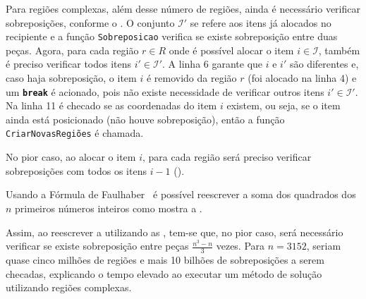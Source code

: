 

Para regiões complexas, além desse número de regiões, ainda é necessário verificar sobreposições,
conforme o .
O conjunto $\mathcal{I'}$ se refere aos itens já alocados no recipiente e a função
\texttt{Sobreposicao} verifica se existe sobreposição entre duas peças.
Agora, para cada região $r \in R$ onde é possível alocar o item $i \in \mathcal{I}$, também é
preciso verificar todos itens $i' \in \mathcal{I'}$.
A linha 6 garante que $i$ e $i'$ são diferentes e, caso haja sobreposição, o item $i$ é removido
da região $r$ (foi alocado na linha 4) e um \texttt{\textbf{break}} é acionado, pois não existe
necessidade de verificar outros itens $i' \in \mathcal{I'}$.
Na linha 11 é checado se as coordenadas do item $i$ existem, ou seja, se o item ainda está
posicionado (não houve sobreposição), então a função \texttt{CriarNovasRegiões} é chamada.



No pior caso, ao alocar o item $i$, para cada região será preciso verificar sobreposições com
todos os itens $i - 1$ ().



Usando a Fórmula de Faulhaber~\cite{merca2015alternative} é possível reescrever a soma dos quadrados
dos $n$ primeiros números inteiros como mostra a .



Assim, ao reescrever a  utilizando as ,
tem-se que, no pior caso, será necessário verificar se existe sobreposição entre peças
$\frac{n^3-n}{3}$ vezes.
Para $n = 3152$, seriam quase cinco milhões de regiões e mais 10 bilhões de sobreposições a serem
checadas, explicando o tempo elevado ao executar um método de solução utilizando regiões complexas.